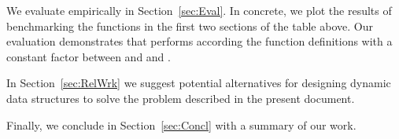 We evaluate \dyntset empirically in Section~\ref{sec:Eval}. In concrete, we plot the results of benchmarking the functions in the first two sections of the table above. Our evaluation demonstrates that \dyntset performs according the function definitions with a constant factor between \conn and \link and \cut. 

In Section~\ref{sec:RelWrk} we suggest potential alternatives for designing dynamic data structures to solve the problem described in the present document. 

Finally, we conclude in Section~\ref{sec:Concl} with a summary of our work.



